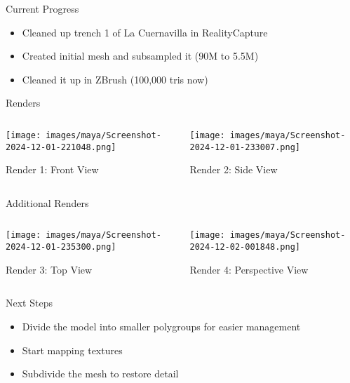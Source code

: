 \begin{frame}{Current Progress}
    \begin{itemize}
        \item Cleaned up trench 1 of La Cuernavilla in RealityCapture
        \item Created initial mesh and subsampled it (90M to 5.5M)
        \item Cleaned it up in ZBrush (100,000 tris now)
    \end{itemize}    
\end{frame}

\begin{frame}{Renders}
    \begin{columns}[T] %
        \begin{column}{0.5\textwidth}
            \texttt{[image: images/maya/Screenshot-2024-12-01-221048.png]}
            \caption{Render 1: Front View}
        \end{column}
        \begin{column}{0.5\textwidth}
            \texttt{[image: images/maya/Screenshot-2024-12-01-233007.png]}
            \caption{Render 2: Side View}
        \end{column}
    \end{columns}
\end{frame}

\begin{frame}{Additional Renders}
    \begin{columns}[T] %
        \begin{column}{0.5\textwidth}
            \texttt{[image: images/maya/Screenshot-2024-12-01-235300.png]}
            \caption{Render 3: Top View}
        \end{column}
        \begin{column}{0.5\textwidth}
            \texttt{[image: images/maya/Screenshot-2024-12-02-001848.png]}
            \caption{Render 4: Perspective View}
        \end{column}
    \end{columns}
\end{frame}

\begin{frame}{Next Steps}
    \begin{itemize}
        \item Divide the model into smaller polygroups for easier management
        \item Start mapping textures
        \item Subdivide the mesh to restore detail
    \end{itemize}    
\end{frame}
